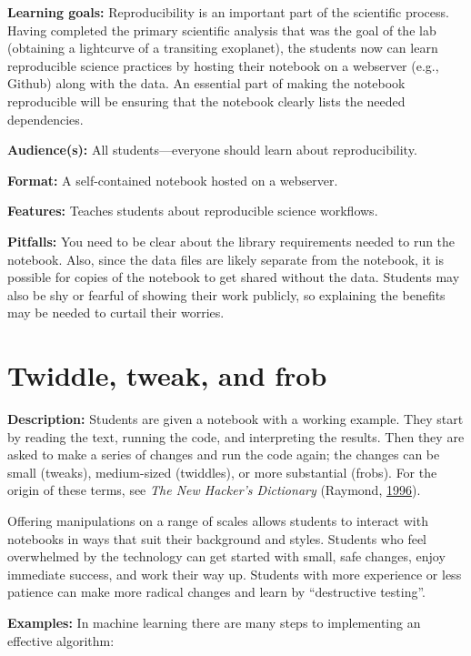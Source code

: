 \documentclass[]{book}
\begin{document}
\textbf{Learning goals:} Reproducibility is an important part of the
scientific process. Having completed the primary scientific analysis
that was the goal of the lab (obtaining a lightcurve of a transiting
exoplanet), the students now can learn reproducible science practices by
hosting their notebook on a webserver (e.g., Github) along with the
data. An essential part of making the notebook reproducible will be
ensuring that the notebook clearly lists the needed dependencies.

\textbf{Audience(s):} All students---everyone should learn about
reproducibility.

\textbf{Format:} A self-contained notebook hosted on a webserver.

\textbf{Features:} Teaches students about reproducible science
workflows.

\textbf{Pitfalls:} You need to be clear about the library requirements
needed to run the notebook. Also, since the data files are likely
separate from the notebook, it is possible for copies of the notebook to
get shared without the data. Students may also be shy or fearful of
showing their work publicly, so explaining the benefits may be needed to
curtail their worries.

\section{Twiddle, tweak, and frob}\label{twiddle-tweak-and-frob}

\textbf{Description:} Students are given a notebook with a working
example. They start by reading the text, running the code, and
interpreting the results. Then they are asked to make a series of
changes and run the code again; the changes can be small (tweaks),
medium-sized (twiddles), or more substantial (frobs). For the origin of
these terms, see \emph{The New Hacker's Dictionary} (Raymond,
\protect\hyperlink{ref-raymond1996new}{1996}).

Offering manipulations on a range of scales allows students to interact
with notebooks in ways that suit their background and styles. Students
who feel overwhelmed by the technology can get started with small, safe
changes, enjoy immediate success, and work their way up. Students with
more experience or less patience can make more radical changes and learn
by ``destructive testing''.

\textbf{Examples:} In machine learning there are many steps to
implementing an effective algorithm:
\end{document}
